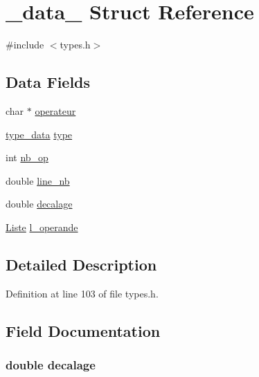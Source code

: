 \hypertarget{struct__data__}{\section{\-\_\-data\-\_\- Struct Reference}
\label{struct__data__}
}


{\ttfamily \#include $<$types.\-h$>$}

\subsection*{Data Fields}
\begin{DoxyCompactItemize}
\item 
char $\ast$ \hyperlink{struct__data___adc2a267b945f31e8e0dad4b528128cab}{operateur}
\item 
\hyperlink{types_8h_a7faf8310f85d4b91ee4ec3f72cfc2d43}{type\-\_\-data} \hyperlink{struct__data___a610c78eb1986b43eaacecfddf32b24d2}{type}
\item 
int \hyperlink{struct__data___a88a29c0db6a919d126d1c94d573dd711}{nb\-\_\-op}
\item 
double \hyperlink{struct__data___a808a37180ef5a21555b2f0f68cf73cb6}{line\-\_\-nb}
\item 
double \hyperlink{struct__data___aac945295366b3dadfd1ec0da01eb6cb8}{decalage}
\item 
\hyperlink{liste_8h_a5268448ae2a031c105e053d5ea682580}{Liste} \hyperlink{struct__data___acdac487d99d10dba873a0f07707b220f}{l\-\_\-operande}
\end{DoxyCompactItemize}


\subsection{Detailed Description}


Definition at line 103 of file types.\-h.



\subsection{Field Documentation}
\hypertarget{struct__data___aac945295366b3dadfd1ec0da01eb6cb8}{
\subsubsection[{decalage}]{\setlength{\rightskip}{0pt plus 5cm}double decalage}}\label{struct__data___aac945295366b3dadfd1ec0da01eb6cb8}


